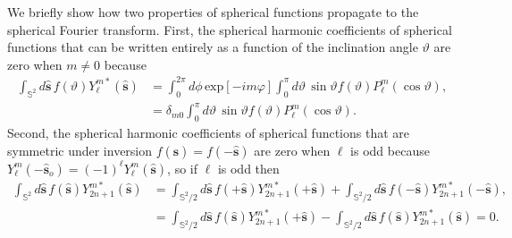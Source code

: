\documentclass[]{osa-article}
\providecommand{\so}{\mathbf{\hat{s}}_o}
\providecommand{\mh}[1]{\mathbf{\hat{#1}}}
\providecommand{\mbb}[1]{\mathbb{#1}}
\begin{document}
We briefly show how two properties of spherical functions propagate to the
spherical Fourier transform. First, the spherical harmonic coefficients of
spherical functions that can be written entirely as a function of the
inclination angle $\vartheta$ are zero when $m\neq0$ because
\begin{align}
  \int_{\mbb{S}^2}d\mh{s}\, f(\vartheta)Y_\ell^{m*}(\mh{s}) &= \int_0^{2\pi}d\phi\, \text{exp}[-im\varphi]\int_0^{\pi}d\vartheta\, \sin\vartheta f(\vartheta)P_\ell^m(\cos\vartheta),\\ &= \delta_{m0}\int_0^{\pi}d\vartheta\, \sin\vartheta f(\vartheta)P_\ell^m(\cos\vartheta).
\end{align}
Second, the spherical harmonic coefficients of spherical functions that are
symmetric under inversion $f(\mh{s}) = f(-\mh{s})$ are zero when $\ell$ is odd
because $Y_\ell^m(-\so) = (-1)^\ell Y_\ell^m(\mh{s})$, so if $\ell$ is odd then
\begin{align}
  \int_{\mbb{S}^2}d\mh{s}\, f(\mh{s})Y_{2n+1}^{m*}(\mh{s}) &= \int_{\mbb{S}^2/2}d\mh{s}\, f(+\mh{s})Y_{2n+1}^{m*}(+\mh{s}) + \int_{\mbb{S}^2/2}d\mh{s}\, f(-\mh{s})Y_{2n+1}^{m*}(-\mh{s}),\\
&=\int_{\mbb{S}^2/2}d\mh{s}\, f(\mh{s})Y_{2n+1}^{m*}(+\mh{s}) - \int_{\mbb{S}^2/2}d\mh{s}\, f(\mh{s})Y_{2n+1}^{m*}(\mh{s}) = 0.                                                                
\end{align}
\end{document}
